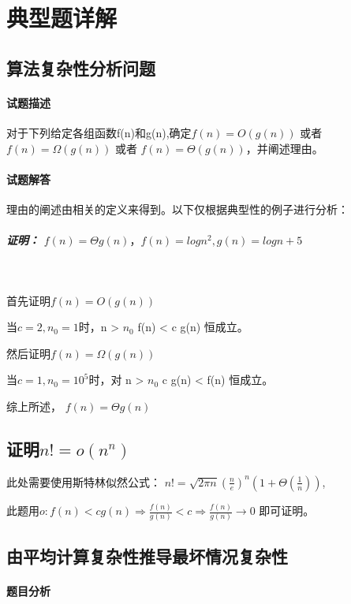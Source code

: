 \documentclass[UTF8]{ctexart}
\begin{document}
    \section{典型题详解}
    \subsection{算法复杂性分析问题}
    \paragraph{试题描述}

    对于下列给定各组函数f(n)和g(n),确定$f(n) = O(g(n))$ 或者$ f(n) = \Omega (g(n)) $ 或者 $f(n) = \Theta(g(n))$，并阐述理由。

    \paragraph{试题解答}

    理由的阐述由相关的定义来得到。以下仅根据典型性的例子进行分析：

    \subparagraph{证明： $f(n) = \Theta g(n)， f(n)=logn^2, g(n)=log n + 5$}
    
    ~

    首先证明$f(n) = O(g(n))$

    当$c=2,n_0=1$时，n > $n_0$ f(n) < c g(n) 恒成立。

    然后证明$f(n) = \Omega (g(n))$

    当$c=1,n_0=10^5$时，对 n > $n_0$ c g(n) < f(n) 恒成立。

    综上所述，   $f(n) = \Theta g(n)$

    \subsection{证明$n!=o(n^n)$}

    此处需要使用斯特林似然公式： $n!=\sqrt{2\pi n}(\frac{n}{e})^n(1+\Theta(\frac{1}{n}))$,

    此题用$o: f(n) < c g(n)  \Rightarrow \frac{f(n)}{g(n)} < c \Rightarrow \frac{f(n)}{g(n)} \to 0 $ 即可证明。

    \subsection{由平均计算复杂性推导最坏情况复杂性}

    \paragraph{题目分析}
\end{document}
